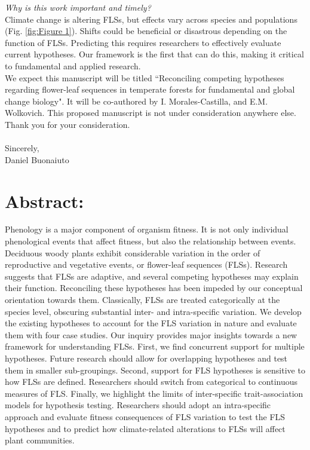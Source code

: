 \documentclass[11pt,a4paper]{article}
\begin{document}
\noindent \emph{Why is this work important and timely?}\\

\noindent Climate change is altering FLSs, but effects vary across species and populations (Fig. \ref{fig:Figure 1}). Shifts could be beneficial or disastrous depending on the function of FLSs. Predicting this requires researchers to effectively evaluate current hypotheses. Our framework is the first that can do this, making it critical to fundamental and applied research.\\

 \noindent We expect this manuscript will be titled ``Reconciling competing hypotheses regarding flower-leaf sequences in temperate forests for fundamental and global change biology". It will be co-authored by I. Morales-Castilla, and E.M. Wolkovich. This proposed manuscript is not under consideration anywhere else. Thank you for your consideration.\\
\\Sincerely,\\

Daniel Buonaiuto
\newpage
\section*{Abstract:}
Phenology is a major component of organism fitness. It is not only individual phenological events that affect fitness, but also the relationship between events. Deciduous woody plants exhibit considerable variation in the order of reproductive and vegetative events, or flower-leaf sequences (FLSs). Research suggests that FLSs are adaptive, and several competing hypotheses may explain their function. Reconciling these hypotheses has been impeded by our conceptual orientation towards them. Classically, FLSs are treated categorically at the species level, obscuring substantial inter- and intra-specific variation. We develop the existing hypotheses to account for the FLS variation in nature and evaluate them with four case studies. Our inquiry provides major insights towards a new framework for understanding FLSs. First, we find concurrent support for multiple hypotheses. Future research should allow for overlapping hypotheses and test them in smaller sub-groupings. Second, support for FLS hypotheses is sensitive to how FLSs are defined. Researchers should switch from categorical to continuous measures of FLS. Finally, we highlight the limits of inter-specific trait-association models for hypothesis testing. Researchers should adopt an intra-specific approach and evaluate fitness consequences of FLS variation to test the FLS hypotheses and to predict how climate-related alterations to FLSs will affect plant communities.
\end{document}
